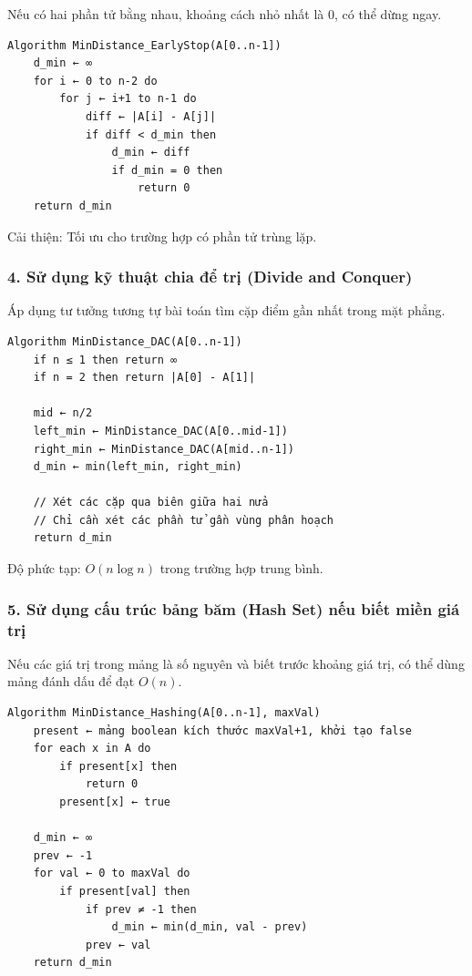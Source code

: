 \documentclass[12pt,a4paper]{article}
\begin{document}
Nếu có hai phần tử bằng nhau, khoảng cách nhỏ nhất là 0, có thể dừng ngay.

\begin{lstlisting}
Algorithm MinDistance_EarlyStop(A[0..n-1])
    d_min ← ∞
    for i ← 0 to n-2 do
        for j ← i+1 to n-1 do
            diff ← |A[i] - A[j]|
            if diff < d_min then
                d_min ← diff
                if d_min = 0 then
                    return 0
    return d_min
\end{lstlisting}

Cải thiện: Tối ưu cho trường hợp có phần tử trùng lặp.

\subsubsection*{4. Sử dụng kỹ thuật chia để trị (Divide and Conquer)}

Áp dụng tư tưởng tương tự bài toán tìm cặp điểm gần nhất trong mặt phẳng.

\begin{lstlisting}
Algorithm MinDistance_DAC(A[0..n-1])
    if n ≤ 1 then return ∞
    if n = 2 then return |A[0] - A[1]|
    
    mid ← n/2
    left_min ← MinDistance_DAC(A[0..mid-1])
    right_min ← MinDistance_DAC(A[mid..n-1])
    d_min ← min(left_min, right_min)
    
    // Xét các cặp qua biên giữa hai nửa
    // Chỉ cần xét các phần tử gần vùng phân hoạch
    return d_min
\end{lstlisting}

Độ phức tạp: $O(n \log n)$ trong trường hợp trung bình.

\subsubsection*{5. Sử dụng cấu trúc bảng băm (Hash Set) nếu biết miền giá trị}

Nếu các giá trị trong mảng là số nguyên và biết trước khoảng giá trị, có thể dùng mảng đánh dấu để đạt $O(n)$.

\begin{lstlisting}
Algorithm MinDistance_Hashing(A[0..n-1], maxVal)
    present ← mảng boolean kích thước maxVal+1, khởi tạo false
    for each x in A do
        if present[x] then
            return 0
        present[x] ← true
    
    d_min ← ∞
    prev ← -1
    for val ← 0 to maxVal do
        if present[val] then
            if prev ≠ -1 then
                d_min ← min(d_min, val - prev)
            prev ← val
    return d_min
\end{lstlisting}
\end{document}
